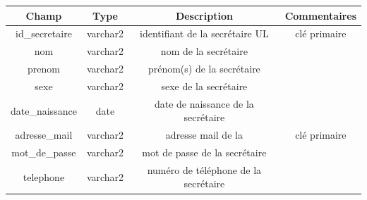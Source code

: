 \documentclass{scrreprt}
\begin{document}
\begin{center}
\begin{tabular}{|c|c|c|c|}
  \hline
  \textbf {Champ} & \textbf {Type} & \textbf {Description} & \textbf {Commentaires} \\
  \hline
  id_secretaire & varchar2 & identifiant de la secrétaire UL & clé primaire\\
  \hline
  nom & varchar2 & nom de la secrétaire & \\
  \hline
  prenom & varchar2 & prénom(s) de la secrétaire &  \\
  \hline
  sexe & varchar2 & sexe de la secrétaire &  \\
  \hline
  date_naissance & date & date de naissance de la secrétaire &  \\
  \hline
  adresse_mail & varchar2 & adresse mail de la & clé primaire  \\
  \hline
  mot_de_passe & varchar2 & mot de passe de la secrétaire &  \\
  \hline
  telephone & varchar2 & numéro de téléphone de la secrétaire &  \\
  \hline
\end{tabular}

\end{center}
\end{document}
